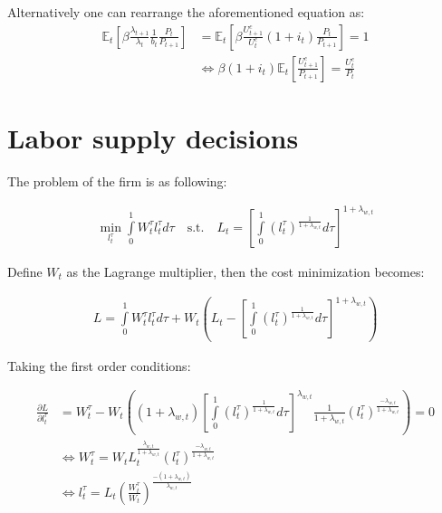 \documentclass{pracamgr}
\numberwithin{equation}{section}
\begin{document}
Alternatively one can rearrange the aforementioned equation as:
\begin{align}
\mathbb{E}_{t} \left[ \beta \frac{\lambda_{t+1}}{\lambda_{t}} \frac{1}{b_{t}}\frac{P_{t}}{P_{t+1}} \right] &= \mathbb{E}_{t} \left[ \beta \frac{U^{c}_{t+1}}{U^{c}_{t}} (1 + i_{t}) \frac{P_{t}}{P_{t+1}} \right] = 1 \nonumber \\
& \iff \beta (1 + i_{t}) \mathbb{E}_{t} \left[ \frac{U_{t+1}^{c}}{P_{t+1}} \right] = \frac{U_{t}^{c}}{P_{t}}
\end{align}

\section*{Labor supply decisions}

The problem of the firm is as following:

\begin{align}
\min_{l_{t}^{\tau}} \int\limits_{0}^{1} W_{t}^{\tau} l_{t}^{\tau} d\tau \quad \text{s.t.} \quad L_{t} = \left[ \int\limits_{0}^{1} \left( l_{t}^{\tau} \right)^{\frac{1}{1+\lambda_{w,t}}} d\tau \right]^{1+\lambda_{w,t}}
\end{align}

Define $W_{t}$ as the Lagrange multiplier, then the cost minimization becomes:

\begin{align}
L = \int\limits_{0}^{1} W_{t}^{\tau} l_{t}^{\tau} d\tau + W_{t} \left( L_{t} - \left[ \int\limits_{0}^{1} \left( l_{t}^{\tau} \right)^{\frac{1}{1+\lambda_{w,t}}} d\tau \right]^{1+\lambda_{w,t}} \right)
\end{align}

Taking the first order conditions:

\begin{align} \label{Optimal demand function for labor}
\frac{\partial L}{\partial l_{t}^{\tau}} &= W_{t}^{\tau} - W_{t} \left( \left( 1+\lambda_{w ,t} \right) \left[  \int\limits_{0}^{1} \left( l_{t}^{\tau} \right)^{\frac{1}{1+\lambda_{w ,t}}} d\tau \right]^{\lambda_{w ,t}} \frac{1}{1+\lambda_{w ,t}}  \left( l_{t}^{\tau} \right)^{\frac{-\lambda_{w ,t}}{1+\lambda_{w ,t}}} \right) = 0 \nonumber \\
& \iff W_{t}^{\tau} = W_{t} L_{t}^{\frac{\lambda_{w ,t}}{1+\lambda_{w,t}}} \left( l_{t}^{\tau} \right)^{\frac{-\lambda_{w,t}}{1+\lambda_{w ,t}}} \nonumber \\
& \iff l_{t}^{\tau}= L_{t} \left( \frac{W_{t}^{\tau}}{W_{t}}\right)^{\frac{-(1+\lambda_{w,t})}{\lambda_{w ,t}}}
\end{align} 
\end{document}
